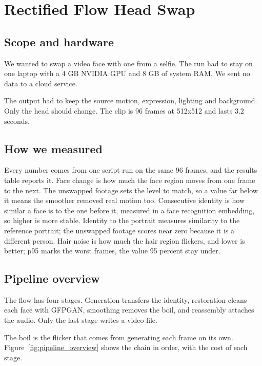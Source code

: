 
\section{Rectified Flow Head Swap}

\subsection{Scope and hardware}
We wanted to swap a video face with one from a selfie. The run had to stay on one laptop with a 4 GB NVIDIA GPU and 8 GB of system RAM. We sent no data to a cloud service.

The output had to keep the source motion, expression, lighting and background. Only the head should change. The clip is 96 frames at 512x512 and lasts 3.2 seconds.

\subsection{How we measured}
Every number comes from one script run on the same 96 frames, and the results table reports it. Face change is how much the face region moves from one frame to the next. The unswapped footage sets the level to match, so a value far below it means the smoother removed real motion too. Consecutive identity is how similar a face is to the one before it, measured in a face recognition embedding, so higher is more stable. Identity to the portrait measures similarity to the reference portrait; the unswapped footage scores near zero because it is a different person. Hair noise is how much the hair region flickers, and lower is better; p95 marks the worst frames, the value 95 percent stay under.

\subsection{Pipeline overview}
The flow has four stages. Generation transfers the identity, restoration cleans each face with GFPGAN, smoothing removes the boil, and reassembly attaches the audio. Only the last stage writes a video file.

The boil is the flicker that comes from generating each frame on its own. Figure~\ref{fig:pipeline_overview} shows the chain in order, with the cost of each stage.

